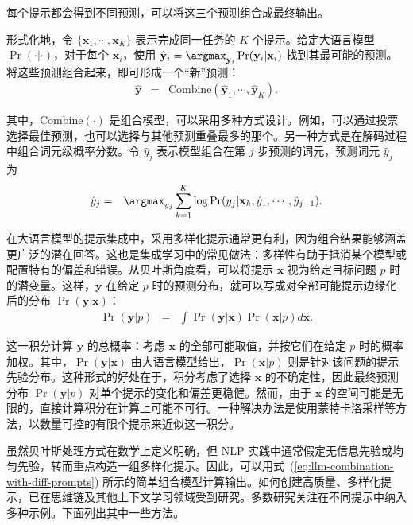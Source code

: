 \noindent 每个提示都会得到不同预测，可以将这三个预测组合成最终输出。

形式化地，令 $\{\mathbf{x}_1,\cdots,\mathbf{x}_K\}$ 表示完成同一任务的 $K$ 个提示。给定大语言模型 $\Pr(\cdot|\cdot)$，对于每个 $\mathbf{x}_i$，使用 $\hat{\mathbf{y}}_i= \argmax_{\mathbf{y}_i} \Pr(\mathbf{y}_i|\mathbf{x}_i)$ 找到其最可能的预测。将这些预测组合起来，即可形成一个“新”预测：
\begin{eqnarray}
\hat{\mathbf{y}} & = & \mathrm{Combine}(\hat{\mathbf{y}}_1,\cdots,\hat{\mathbf{y}}_K). \label{eq:llm-combination-with-diff-prompts}
\end{eqnarray}

\noindent 其中，$\mathrm{Combine}(\cdot)$ 是组合模型，可以采用多种方式设计。例如，可以通过投票选择最佳预测，也可以选择与其他预测重叠最多的那个。另一种方式是在解码过程中组合词元级概率分数。令 $\hat{y}_{j}$ 表示模型组合在第 $j$ 步预测的词元，预测词元 $\hat{y}_{j}$ 为
\begin{eqnarray}
\hat{y}_{j} & = & \argmax_{y_j} \sum_{k=1}^{K} \log \Pr(y_j|\mathbf{x}_k,\hat{y}_1,\cdots,\hat{y}_{j-1}).
\end{eqnarray}

在大语言模型的提示集成中，采用多样化提示通常更有利，因为组合结果能够涵盖更广泛的潜在回答。这也是集成学习中的常见做法：多样性有助于抵消某个模型或配置特有的偏差和错误。从贝叶斯角度看，可以将提示 $\mathbf{x}$ 视为给定目标问题 $p$ 时的潜变量。这样，$\mathbf{y}$ 在给定 $p$ 时的预测分布，就可以写成对全部可能提示边缘化后的分布 $\Pr(\mathbf{y}|\mathbf{x})$：
\begin{eqnarray}
\Pr(\mathbf{y}|p) & = & \int \Pr(\mathbf{y}|\mathbf{x}) \Pr(\mathbf{x}|p) d \mathbf{x}.
\end{eqnarray}

\noindent 这一积分计算 $\mathbf{y}$ 的总概率：考虑 $\mathbf{x}$ 的全部可能取值，并按它们在给定 $p$ 时的概率加权。其中，$\Pr(\mathbf{y}|\mathbf{x})$ 由大语言模型给出，$\Pr(\mathbf{x}|p)$ 则是针对该问题的提示先验分布。这种形式的好处在于，积分考虑了选择 $\mathbf{x}$ 的不确定性，因此最终预测分布 $\Pr(\mathbf{y}|p)$ 对单个提示的变化和偏差更稳健。然而，由于 $\mathbf{x}$ 的空间可能是无限的，直接计算积分在计算上可能不可行。一种解决办法是使用蒙特卡洛采样等方法，以数量可控的有限个提示来近似这一积分。

虽然贝叶斯处理方式在数学上定义明确，但 NLP 实践中通常假定无信息先验或均匀先验，转而重点构造一组多样化提示。因此，可以用式~(\ref{eq:llm-combination-with-diff-prompts}) 所示的简单组合模型计算输出。如何创建高质量、多样化提示，已在思维链及其他上下文学习领域受到研究。多数研究关注在不同提示中纳入多种示例。下面列出其中一些方法。

